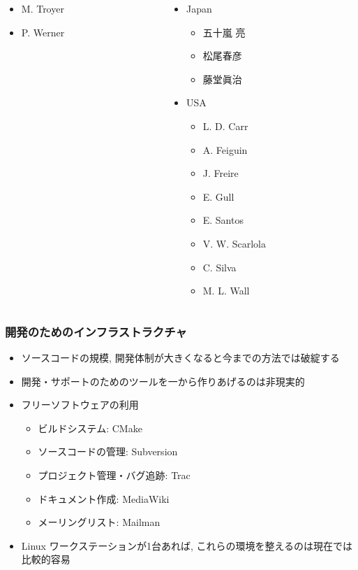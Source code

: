\begin{frame}
\begin{columns}[T]
\begin{column}{.35\textwidth}
\begin{itemize}
\begin{itemize}
        \item M. Troyer
        \item P. Werner
        \end{itemize}
      \end{itemize}
    \end{column}
    \begin{column}{.35\textwidth}
      \begin{itemize}
      \item Japan
        \begin{itemize}
        \item 五十嵐 亮
        \item 松尾春彦
        \item 藤堂眞治
        \end{itemize}
      \item USA
        \begin{itemize}
        \item L. D. Carr
        \item A. Feiguin
        \item J. Freire
        \item E. Gull
        \item E. Santos
        \item V. W. Scarlola
        \item C. Silva
        \item M. L. Wall
        \end{itemize}
      \end{itemize}
    \end{column}
  \end{columns}
\end{frame}

\begin{frame}
  \frametitle{開発のためのインフラストラクチャ}
  \begin{itemize}
  \item ソースコードの規模, 開発体制が大きくなると今までの方法では破綻する
  \item 開発・サポートのためのツールを一から作りあげるのは非現実的
  \item フリーソフトウェアの利用
    \begin{itemize}
    \item ビルドシステム: CMake
    \item ソースコードの管理: Subversion
    \item プロジェクト管理・バグ追跡: Trac
    \item ドキュメント作成: MediaWiki
    \item メーリングリスト: Mailman
    \end{itemize}
  \item Linux ワークステーションが1台あれば, これらの環境を整えるのは現在では比較的容易
  \end{itemize}
\end{frame}

